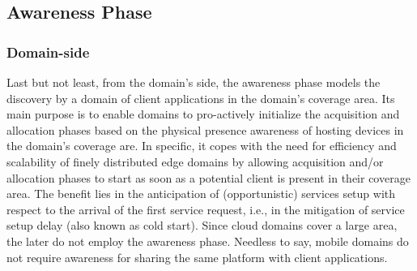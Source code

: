 



\subsection{Awareness Phase}\label{sec:A3-E-awareness}




\subsubsection*{Domain-side} Last but not least, from the domain's side, the awareness phase models the discovery by a domain of client applications in the domain's coverage area. Its main purpose is to enable domains to pro-actively initialize the acquisition and allocation phases based on the physical presence awareness of hosting devices in the domain's coverage are. In specific, it copes with the need for efficiency and scalability of finely distributed edge domains by allowing acquisition and/or allocation phases to start as soon as a potential client is present in their coverage area. The benefit lies in the anticipation of (opportunistic) services setup with respect to the arrival of the first service request, i.e., in the mitigation of service setup delay (also known as cold start). Since cloud domains cover a large area, the later do not employ the awareness phase. Needless to say, mobile domains do not require awareness for sharing the same platform with client applications.

